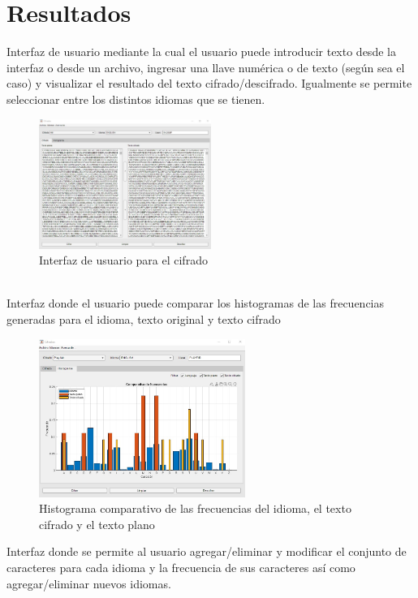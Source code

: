 \documentclass[10pt]{article}
\begin{document}
\section{Resultados}
\justify
Interfaz de usuario mediante la cual el usuario puede introducir texto desde la interfaz o desde un archivo, ingresar una llave numérica o de texto (según sea el caso) y visualizar el resultado del texto cifrado/descifrado.
Igualmente se permite seleccionar entre los distintos idiomas que se tienen.\\
\begin{figure}[!ht]
  \centering
  \includegraphics[width=0.5\textwidth]{GUI_1H}
  \caption{Interfaz de usuario para el cifrado}
  \label{fig_sim}
\end{figure}
\\
Interfaz donde el usuario puede comparar los histogramas de las frecuencias generadas para el idioma, texto original y texto cifrado
\begin{figure}[!ht]
  \centering
  \includegraphics[width=0.6\textwidth]{GUI_2PF}
  \caption{Histograma comparativo de las frecuencias del idioma, el texto cifrado y el texto plano}
  \label{fig_sim}
\end{figure}
\newpage
\justify
Interfaz donde se permite al usuario agregar/eliminar y modificar el conjunto de caracteres para cada idioma y la frecuencia de sus caracteres así como agregar/eliminar nuevos idiomas.\\
\end{document}
